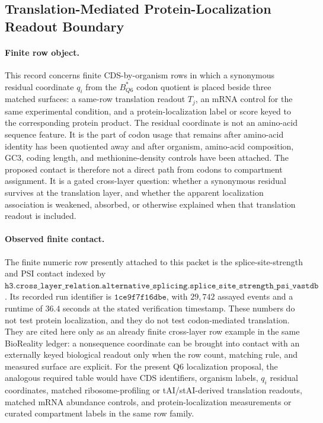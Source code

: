\subsection{Translation-Mediated Protein-Localization Readout Boundary}\label{sec:q6-translation-mediated-protein-localization-readout-cross-layer}

\paragraph{Finite row object.}
This record concerns finite CDS-by-organism rows in which a synonymous residual coordinate $q_i$ from the $B^*_{Q6}$ codon quotient is placed beside three matched surfaces: a same-row translation readout $T_j$, an mRNA control for the same experimental condition, and a protein-localization label or score keyed to the corresponding protein product. The residual coordinate is not an amino-acid sequence feature. It is the part of codon usage that remains after amino-acid identity has been quotiented away and after organism, amino-acid composition, GC3, coding length, and methionine-density controls have been attached. The proposed contact is therefore not a direct path from codons to compartment assignment. It is a gated cross-layer question: whether a synonymous residual survives at the translation layer, and whether the apparent localization association is weakened, absorbed, or otherwise explained when that translation readout is included.

\paragraph{Observed finite contact.}
The finite numeric row presently attached to this packet is the splice-site-strength and PSI contact indexed by $\texttt{h3.cross\_layer\_relation.alternative\_splicing.splice\_site\_strength\_psi\_vastdb}$. Its recorded run identifier is $\texttt{1ce9f7f16dbe}$, with $29{,}742$ assayed events and a runtime of $36.4$ seconds at the stated verification timestamp. These numbers do not test protein localization, and they do not test codon-mediated translation. They are cited here only as an already finite cross-layer row example in the same BioReality ledger: a nonsequence coordinate can be brought into contact with an externally keyed biological readout only when the row count, matching rule, and measured surface are explicit. For the present Q6 localization proposal, the analogous required table would have CDS identifiers, organism labels, $q_i$ residual coordinates, matched ribosome-profiling or tAI/stAI-derived translation readouts, matched mRNA abundance controls, and protein-localization measurements or curated compartment labels in the same row family.

